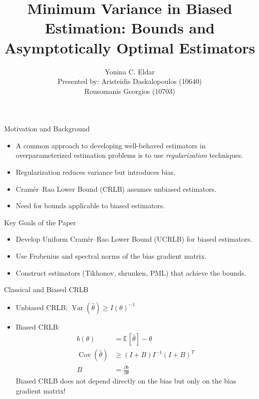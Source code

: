 \documentclass{beamer}
\title[Minimum Variance in Biased Estimation]{Minimum Variance in Biased Estimation: Bounds and Asymptotically Optimal Estimators}
\author{Yonina C. Eldar \\ Presented by: Aristeidis Daskalopoulos (10640) \\ Rousomanis Georgios (10703)}
\institute{IEEE Transactions on Signal Processing, July 2004}
\date{}
\begin{document}
\begin{frame}
  \titlepage
\end{frame}

\begin{frame}{Motivation and Background}
  \begin{itemize}
    \item A common approach to developing well-behaved estimators
    in overparameterized estimation problems is to use \textit{regularization} techniques.
    \item Regularization reduces variance but introduces bias.
    \item Cramér–Rao Lower Bound (CRLB) assumes unbiased estimators.
    \item Need for bounds applicable to biased estimators.
  \end{itemize}
\end{frame}

\begin{frame}{Key Goals of the Paper}
  \begin{itemize}
    \item Develop Uniform Cramér–Rao Lower Bound (UCRLB) for biased estimators.
    \item Use Frobenius and spectral norms of the bias gradient matrix.
    \item Construct estimators (Tikhonov, shrunken, PML) that achieve the bounds.
  \end{itemize}
\end{frame}

\begin{frame}{Classical and Biased CRLB}
  \begin{itemize}
    \item Unbiased CRLB: $\operatorname{Var}(\hat{\theta}) \geq I(\theta)^{-1}$
    \item Biased CRLB:
    \begin{equation*}
        \begin{aligned}
            b(\theta) &= \mathbb{E}[\hat{\theta}] - \theta \\
            \operatorname{Cov}(\hat{\theta}) &\geq (I + B) I^{-1} (I + B)^T \\
            B &= \frac{\partial b}{\partial \theta}
        \end{aligned}
    \end{equation*}
    Biased CRLB does not depend directly on the bias but only on the bias gradient matrix!
  \end{itemize}
\end{frame}
\end{document}
